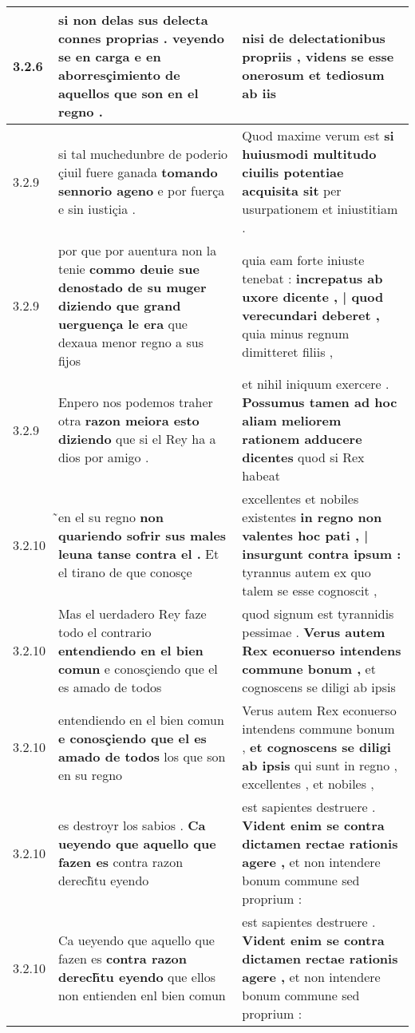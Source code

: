 \begin{tabular}{|p{1cm}|p{6.5cm}|p{6.5cm}|}
3.2.6 & si non delas sus delecta connes proprias . \textbf{ veyendo se en carga e en aborresçimiento } de aquellos que son en el regno . & nisi de delectationibus propriis , \textbf{ videns se esse onerosum et tediosum } ab iis \\\hline
3.2.9 & si tal muchedunbre de poderio çiuil fuere ganada \textbf{ tomando sennorio ageno } e por fuerça e sin iustiçia . & Quod maxime verum est \textbf{ si huiusmodi multitudo ciuilis potentiae acquisita sit } per usurpationem et iniustitiam . \\\hline
3.2.9 & por que por auentura non la tenie \textbf{ commo deuie sue denostado de su muger diziendo que grand uerguença le era } que dexaua menor regno a sus fijos & quia eam forte iniuste tenebat : \textbf{ increpatus ab uxore dicente , | quod verecundari deberet , } quia minus regnum dimitteret filiis , \\\hline
3.2.9 & Enpero nos podemos traher otra \textbf{ razon meiora esto diziendo } que si el Rey ha a dios por amigo . & et nihil iniquum exercere . \textbf{ Possumus tamen ad hoc aliam meliorem rationem adducere dicentes } quod si Rex habeat \\\hline
3.2.10 & ̃en el su regno \textbf{ non quariendo sofrir sus males leuna tanse contra el . } Et el tirano de que conosçe & excellentes et nobiles existentes \textbf{ in regno non valentes hoc pati , | insurgunt contra ipsum : } tyrannus autem ex quo talem se esse cognoscit , \\\hline
3.2.10 & Mas el uerdadero Rey faze todo el contrario \textbf{ entendiendo en el bien comun } e conosçiendo que el es amado de todos & quod signum est tyrannidis pessimae . \textbf{ Verus autem Rex econuerso intendens commune bonum , } et cognoscens se diligi ab ipsis \\\hline
3.2.10 & entendiendo en el bien comun \textbf{ e conosçiendo que el es amado de todos } los que son en su regno & Verus autem Rex econuerso intendens commune bonum , \textbf{ et cognoscens se diligi ab ipsis } qui sunt in regno , excellentes , et nobiles , \\\hline
3.2.10 & es destroyr los sabios . \textbf{ Ca ueyendo que aquello que fazen es } contra razon derech̃tu eyendo & est sapientes destruere . \textbf{ Vident enim se contra dictamen rectae rationis agere , } et non intendere bonum commune sed proprium : \\\hline
3.2.10 & Ca ueyendo que aquello que fazen es \textbf{ contra razon derech̃tu eyendo } que ellos non entienden enl bien comun & est sapientes destruere . \textbf{ Vident enim se contra dictamen rectae rationis agere , } et non intendere bonum commune sed proprium : \\\hline

\end{tabular}
